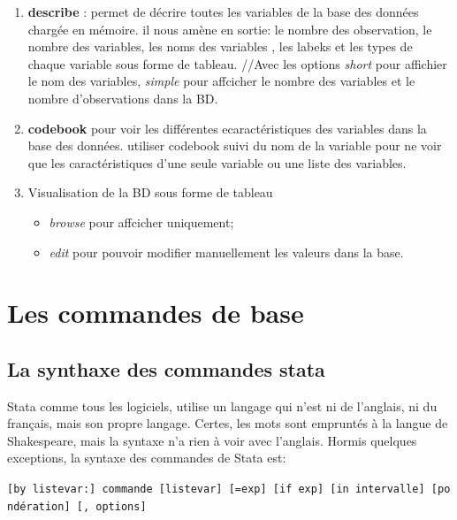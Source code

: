 \documentclass[
]{book}
\providecommand{\tightlist}{%
  \setlength{\itemsep}{0pt}\setlength{\parskip}{0pt}}
\begin{document}
\begin{enumerate}
\def\labelenumi{(\arabic{enumi})}
\tightlist
\item
  \textbf{describe} : permet de décrire toutes les variables de la base des données chargée en mémoire. il nous amène en sortie: le nombre des observation, le nombre des variables, les noms des variables , les labeks et les types de chaque variable sous forme de tableau. //Avec les options \emph{short} pour affichier le nom des variables, \emph{simple} pour affcicher le nombre des variables et le nombre d'observations dans la BD.
\item
  \textbf{codebook} pour voir les différentes ecaractéristiques des variables dans la base des données. utiliser codebook suivi du nom de la variable pour ne voir que les caractéristiques d'une seule variable ou une liste des variables.
\item
  Visualisation de la BD sous forme de tableau

  \begin{itemize}
  \tightlist
  \item
    \emph{browse} pour affcicher uniquement;
  \item
    \emph{edit} pour pouvoir modifier manuellement les valeurs dans la base.
  \end{itemize}
\end{enumerate}

\hypertarget{les-commandes-de-base}{%
\section{Les commandes de base}\label{les-commandes-de-base}}

\hypertarget{la-synthaxe-des-commandes-stata}{%
\subsection{La synthaxe des commandes stata}\label{la-synthaxe-des-commandes-stata}}

Stata comme tous les logiciels, utilise un langage qui n'est ni de
l'anglais, ni du français, mais son propre langage. Certes, les
mots sont empruntés à la langue de Shakespeare, mais la syntaxe
n'a rien à voir avec l'anglais. Hormis quelques exceptions, la
syntaxe des commandes de Stata est:

\texttt{{[}by\ listevar:{]}\ commande\ {[}listevar{]}\ {[}=exp{]}\ {[}if\ exp{]}\ {[}in\ intervalle{]}\ {[}pondération{]}\ {[},\ options{]}}
\end{document}
